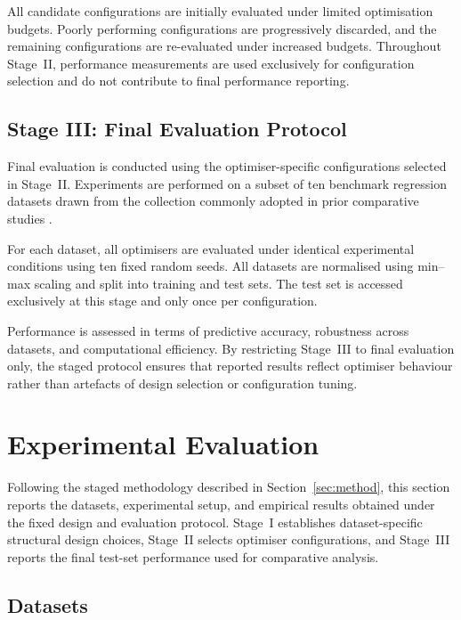 \documentclass[conference]{IEEEtran}
\begin{document}
All candidate configurations are initially evaluated under limited optimisation
budgets.
Poorly performing configurations are progressively discarded, and the remaining
configurations are re-evaluated under increased budgets.
Throughout Stage~II, performance measurements are used exclusively for
configuration selection and do not contribute to final performance reporting.

\subsection{Stage III: Final Evaluation Protocol}

Final evaluation is conducted using the optimiser-specific configurations
selected in Stage~II.
Experiments are performed on a subset of ten benchmark regression datasets drawn
from the collection commonly adopted in prior comparative studies
\cite{zhou2023stochastic}.

For each dataset, all optimisers are evaluated under identical experimental
conditions using ten fixed random seeds.
All datasets are normalised using min--max scaling and split into training and
test sets.
The test set is accessed exclusively at this stage and only once per
configuration.

Performance is assessed in terms of predictive accuracy, robustness across
datasets, and computational efficiency.
By restricting Stage~III to final evaluation only, the staged protocol ensures
that reported results reflect optimiser behaviour rather than artefacts of
design selection or configuration tuning.

\section{Experimental Evaluation}

Following the staged methodology described in
Section~\ref{sec:method}, this section reports the datasets,
experimental setup, and empirical results obtained under the fixed
design and evaluation protocol.
Stage~I establishes dataset-specific structural design choices,
Stage~II selects optimiser configurations, and Stage~III reports the
final test-set performance used for comparative analysis.


\subsection{Datasets}
\end{document}
